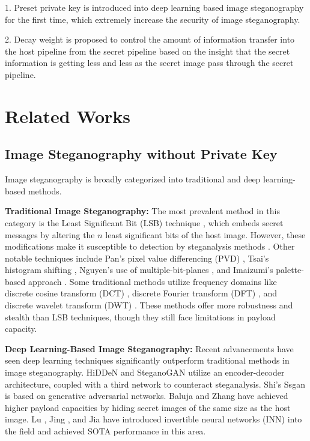 \documentclass{article}
\begin{document}
1. Preset private key is introduced into deep learning based image steganography for the first time, which extremely increase the security of image steganography.

2. Decay weight is proposed to control the amount of information transfer into the host pipeline from the secret pipeline based on the insight that the secret information is getting less and less as the secret image pass through the secret pipeline.



\section{Related Works}
\subsection{Image Steganography without Private Key}
Image steganography is broadly categorized into traditional and deep learning-based methods.

\textbf{Traditional Image Steganography:}
The most prevalent method in this category is the Least Significant Bit (LSB) technique \cite{chan2004hiding,tamimi2013hiding}, which embeds secret messages by altering the $n$ least significant bits of the host image. However, these modifications make it susceptible to detection by steganalysis methods \cite{fridrich2001detecting,hawi2004steganalysis,zhi2003lsb}. Other notable techniques include Pan's pixel value differencing (PVD) \cite{pan2011image}, Tsai's histogram shifting \cite{tsai2009reversible}, Nguyen's use of multiple-bit-planes \cite{nguyen2006multi}, and Imaizumi's palette-based approach \cite{imaizumi2014multibit}. Some traditional methods utilize frequency domains like discrete cosine transform (DCT) \cite{hsu1999hidden}, discrete Fourier transform (DFT) \cite{ruanaidh1996phase}, and discrete wavelet transform (DWT) \cite{barni2001improved}. These methods offer more robustness and stealth than LSB techniques, though they still face limitations in payload capacity.

\textbf{Deep Learning-Based Image Steganography:}
Recent advancements have seen deep learning techniques significantly outperform traditional methods in image steganography. HiDDeN \cite{zhu2018hidden} and SteganoGAN \cite{zhang2019steganogan} utilize an encoder-decoder architecture, coupled with a third network to counteract steganalysis. Shi’s Ssgan \cite{shi2018ssgan} is based on generative adversarial networks. Baluja \cite{Baluja2017Hiding,baluja2019hiding} and Zhang \cite{zhang2020udh} have achieved higher payload capacities by hiding secret images of the same size as the host image. Lu \cite{lu2021large}, Jing \cite{jing2021hinet}, and Jia \cite{jia2023afcihnet} have introduced invertible neural networks (INN) into the field and achieved SOTA performance in this area.
\end{document}
